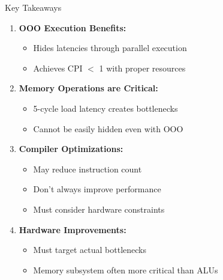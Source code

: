 \documentclass[aspectratio=169,12pt]{beamer}
\begin{document}
\begin{frame}{Key Takeaways}
\begin{enumerate}
    \item \textbf{OOO Execution Benefits:}
    \begin{itemize}
        \item Hides latencies through parallel execution
        \item Achieves CPI $<$ 1 with proper resources
    \end{itemize}
    
    \item \textbf{Memory Operations are Critical:}
    \begin{itemize}
        \item 5-cycle load latency creates bottlenecks
        \item Cannot be easily hidden even with OOO
    \end{itemize}
    
    \item \textbf{Compiler Optimizations:}
    \begin{itemize}
        \item May reduce instruction count
        \item Don't always improve performance
        \item Must consider hardware constraints
    \end{itemize}
    
    \item \textbf{Hardware Improvements:}
    \begin{itemize}
        \item Must target actual bottlenecks
        \item Memory subsystem often more critical than ALUs
    \end{itemize}
\end{enumerate}
\end{frame}
\end{document}
